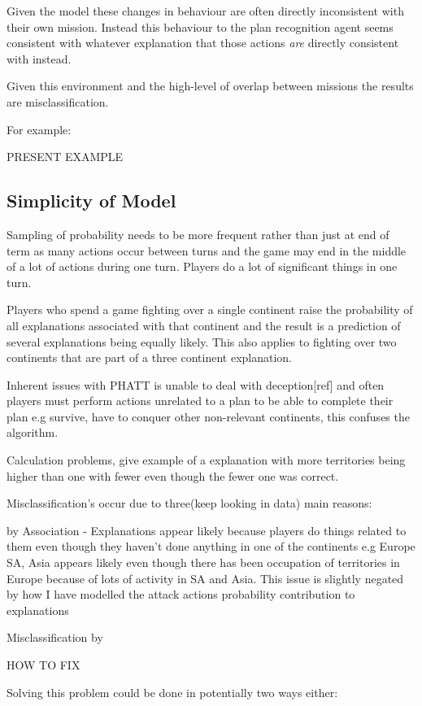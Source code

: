 \documentclass[parskip]{cs4rep}
\begin{document}
Given the model these changes in behaviour are often directly inconsistent with their own mission. Instead this behaviour to the plan recognition agent seems consistent with whatever explanation that those actions \textit{are} directly consistent with instead.

Given this environment and the high-level of overlap between missions the results are misclassification.

For example:

PRESENT EXAMPLE

\subsection{Simplicity of Model}

Sampling of probability needs to be more frequent rather than just at end of term as many actions occur between turns and the game may end in the middle of a lot of actions during one turn. Players do a lot of significant things in one turn.

Players who spend a game fighting over a single continent raise the probability of all explanations associated with that continent and the result is a prediction of several explanations being equally likely. This also applies to fighting over two continents that are part of a three continent explanation.

Inherent issues with PHATT is unable to deal with deception[ref] and often players must perform actions unrelated to a plan to be able to complete their plan e.g survive, have to conquer other non-relevant continents, this confuses the algorithm.

Calculation problems, give example of a explanation with more territories being higher than one with fewer even though the fewer one was correct.

Misclassification's occur due to three(keep looking in data) main reasons:

by Association - Explanations appear likely because players do things related to them even though they haven't done anything in one of the continents e.g Europe SA, Asia appears likely even though there has been occupation of territories in Europe because of lots of activity in SA and Asia. This issue is slightly negated by how I have modelled the attack actions probability contribution to explanations

Misclassification by 

HOW TO FIX

Solving this problem could be done in potentially two ways either:
\end{document}
